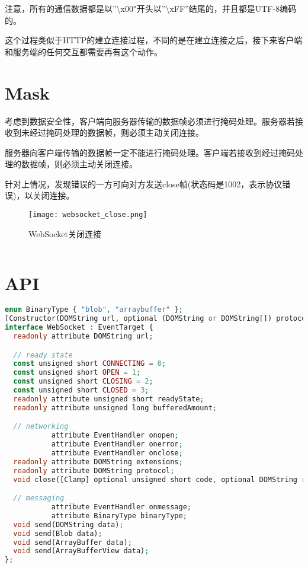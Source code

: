 注意，所有的通信数据都是以”\textbackslash x00″开头以”\textbackslash xFF”结尾的，并且都是UTF-8编码的。

这个过程类似于HTTP的建立连接过程，不同的是在建立连接之后，接下来客户端和服务端的任何交互都需要再有这个动作。

\section{Mask}


考虑到数据安全性，客户端向服务器传输的数据帧必须进行掩码处理。服务器若接收到未经过掩码处理的数据帧，则必须主动关闭连接。

服务器向客户端传输的数据帧一定不能进行掩码处理。客户端若接收到经过掩码处理的数据帧，则必须主动关闭连接。

针对上情况，发现错误的一方可向对方发送close帧(状态码是1002，表示协议错误)，以关闭连接。

\begin{figure}[htbp]
\centering
\texttt{[image: websocket\_close.png]}
\caption{WebSocket关闭连接}
\end{figure}




\begin{lstlisting}[language=PHP]

\end{lstlisting}

\section{API}






\begin{lstlisting}[language=PHP]
enum BinaryType { "blob", "arraybuffer" };
[Constructor(DOMString url, optional (DOMString or DOMString[]) protocols), Exposed=Window,Worker]
interface WebSocket : EventTarget {
  readonly attribute DOMString url;

  // ready state
  const unsigned short CONNECTING = 0;
  const unsigned short OPEN = 1;
  const unsigned short CLOSING = 2;
  const unsigned short CLOSED = 3;
  readonly attribute unsigned short readyState;
  readonly attribute unsigned long bufferedAmount;

  // networking
           attribute EventHandler onopen;
           attribute EventHandler onerror;
           attribute EventHandler onclose;
  readonly attribute DOMString extensions;
  readonly attribute DOMString protocol;
  void close([Clamp] optional unsigned short code, optional DOMString reason);

  // messaging
           attribute EventHandler onmessage;
           attribute BinaryType binaryType;
  void send(DOMString data);
  void send(Blob data);
  void send(ArrayBuffer data);
  void send(ArrayBufferView data);
};
\end{lstlisting}





